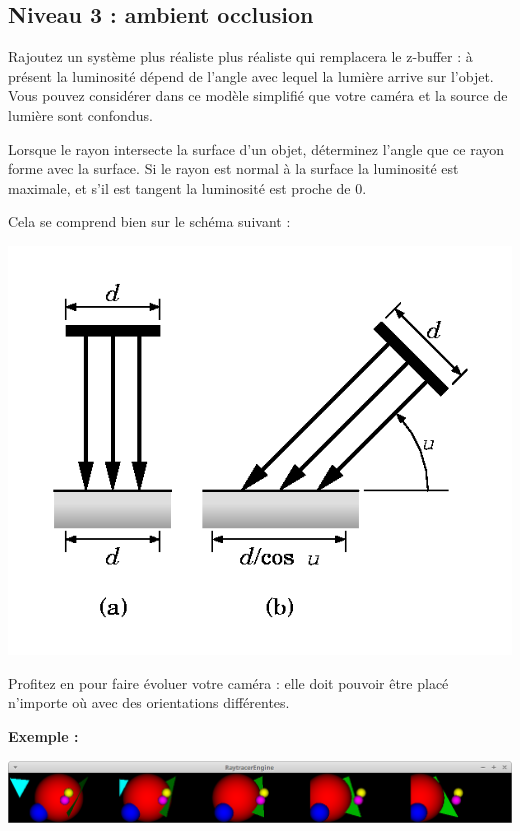 \documentclass[a4paper, 11pt]{article}
\begin{document}
\subsection*{Niveau 3 : ambient occlusion}

Rajoutez un système plus réaliste plus réaliste qui remplacera le z-buffer : à présent la luminosité dépend de l'angle avec lequel la lumière arrive sur l'objet. Vous pouvez considérer dans ce modèle simplifié que votre caméra et la source de lumière sont confondus.  
  
Lorsque le rayon intersecte la surface d'un objet, déterminez l'angle que ce rayon forme avec la surface. Si le rayon est normal à la surface la luminosité est maximale, et s'il est tangent la luminosité est proche de 0.  
  
Cela se comprend bien sur le schéma suivant :  

\begin{center}
\includegraphics[scale=0.3]{an06f16.png} 
\end{center}  
  
Profitez en pour faire évoluer votre caméra : elle doit pouvoir être placé n'importe où avec des orientations différentes.  
  
  
\textbf{Exemple :}
  
\begin{center}
\includegraphics[scale=0.45]{multi-orientations.png} 
\end{center}
\end{document}
